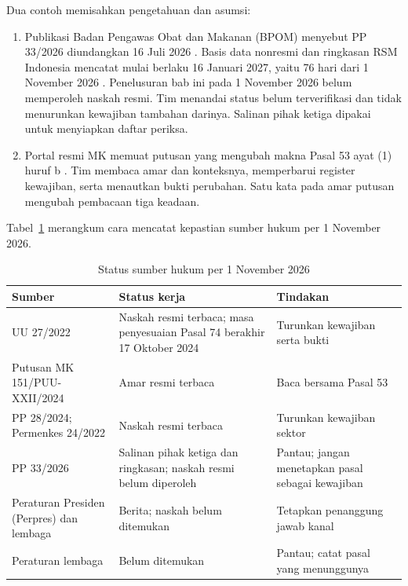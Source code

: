Dua contoh memisahkan pengetahuan dan asumsi:
\begin{enumerate}
  \item Publikasi Badan Pengawas Obat dan Makanan (BPOM) menyebut PP 33/2026 diundangkan 16 Juli
  2026 \cite{bpom-pp33-2026-status}. Basis data nonresmi dan ringkasan RSM Indonesia mencatat mulai
  berlaku 16 Januari 2027, yaitu 76 hari dari 1 November 2026
  \cite{c03-pp33-nonresmi,c07-rsm-pp33}. Penelusuran bab ini pada 1 November 2026 belum memperoleh
  naskah resmi. Tim menandai status belum terverifikasi dan tidak menurunkan kewajiban tambahan
  darinya. Salinan pihak ketiga dipakai untuk menyiapkan daftar periksa.
  \item Portal resmi MK memuat putusan yang mengubah makna Pasal 53 ayat (1) huruf b
  \cite{c07-mk151}. Tim membaca amar dan konteksnya, memperbarui register kewajiban, serta menautkan
  bukti perubahan. Satu kata pada amar putusan mengubah pembacaan tiga keadaan.
\end{enumerate}

Tabel~\ref{tab:ch07-status} merangkum cara mencatat kepastian sumber hukum per 1 November 2026.

\begin{table}[!htb]
  \centering\small
  \caption{Status sumber hukum per 1 November 2026}\label{tab:ch07-status}
  \begin{tabularx}{\textwidth}{|>{\raggedright\arraybackslash}p{}|>{\raggedright\arraybackslash}X|>{\raggedright\arraybackslash}X|}
    \hline
    \textbf{Sumber} & \textbf{Status kerja} & \textbf{Tindakan} \\ \hline
    UU 27/2022 & Naskah resmi terbaca; masa penyesuaian Pasal 74 berakhir 17 Oktober 2024 & Turunkan
    kewajiban serta bukti \\ \hline
    Putusan MK 151/PUU-XXII/2024 & Amar resmi terbaca & Baca bersama Pasal 53 \\ \hline
    PP 28/2024; Permenkes 24/2022 & Naskah resmi terbaca & Turunkan kewajiban sektor \\ \hline
    PP 33/2026 & Salinan pihak ketiga dan ringkasan; naskah resmi belum diperoleh & Pantau; jangan
    menetapkan pasal sebagai kewajiban \\ \hline
    Peraturan Presiden (Perpres) dan lembaga & Berita; naskah belum ditemukan & Tetapkan penanggung
    jawab kanal \\ \hline
    Peraturan lembaga & Belum ditemukan & Pantau; catat pasal yang menunggunya \\ \hline
  \end{tabularx}
\end{table}

